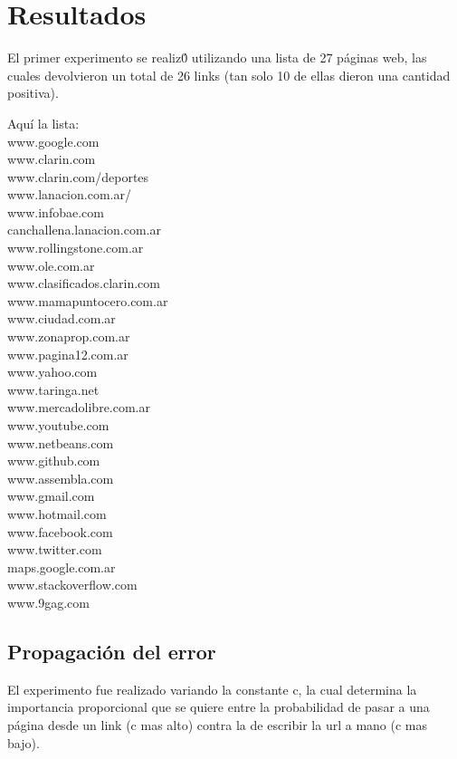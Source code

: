 \section{Resultados}

El primer experimento se realiz\'0 utilizando una lista de 27 p\'aginas web, las cuales devolvieron un
total de 26 links (tan solo 10 de ellas dieron una cantidad positiva).

Aqu\'i la lista:\\
www.google.com\\ 
www.clarin.com\\
www.clarin.com/deportes\\
www.lanacion.com.ar/\\    
www.infobae.com\\
canchallena.lanacion.com.ar\\
www.rollingstone.com.ar\\
www.ole.com.ar\\
www.clasificados.clarin.com\\
www.mamapuntocero.com.ar\\
www.ciudad.com.ar\\
www.zonaprop.com.ar\\
www.pagina12.com.ar\\
www.yahoo.com\\
www.taringa.net\\
www.mercadolibre.com.ar\\
www.youtube.com\\
www.netbeans.com\\
www.github.com\\
www.assembla.com\\
www.gmail.com\\
www.hotmail.com\\
www.facebook.com\\
www.twitter.com\\
maps.google.com.ar\\
www.stackoverflow.com\\
www.9gag.com\\

\subsection{Propagaci\'on del error}

El experimento fue realizado variando la constante c, la cual determina la importancia proporcional que se quiere
entre la probabilidad de pasar a una p\'agina desde un link (c mas alto) contra la de escribir la url a mano (c mas bajo).

